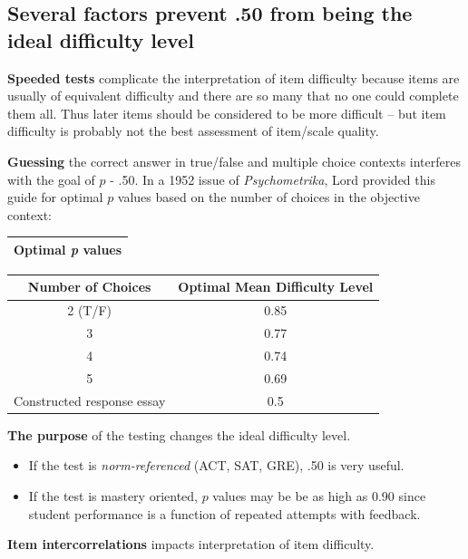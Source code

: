 \documentclass[
  english,
]{book}
\providecommand{\tightlist}{%
  \setlength{\itemsep}{0pt}\setlength{\parskip}{0pt}}
\begin{document}
\hypertarget{several-factors-prevent-.50-from-being-the-ideal-difficulty-level}{%
\subsection{Several factors prevent .50 from being the ideal difficulty level}\label{several-factors-prevent-.50-from-being-the-ideal-difficulty-level}}

\textbf{Speeded tests} complicate the interpretation of item difficulty because items are usually of equivalent difficulty and there are so many that no one could complete them all. Thus later items should be considered to be more difficult -- but item difficulty is probably not the best assessment of item/scale quality.

\textbf{Guessing} the correct answer in true/false and multiple choice contexts interferes with the goal of \(p\) - .50. In a 1952 issue of \emph{Psychometrika}, Lord provided this guide for optimal \(p\) values based on the number of choices in the objective context:

\begin{longtable}[]{@{}l@{}}
\toprule
Optimal \emph{p} values \\
\midrule
\endhead
\bottomrule
\end{longtable}

\begin{longtable}[]{@{}cc@{}}
\toprule
Number of Choices & Optimal Mean Difficulty Level \\
\midrule
\endhead
2 (T/F) & 0.85 \\
3 & 0.77 \\
4 & 0.74 \\
5 & 0.69 \\
Constructed response essay & 0.5 \\
\bottomrule
\end{longtable}

\textbf{The purpose} of the testing changes the ideal difficulty level.

\begin{itemize}
\tightlist
\item
  If the test is \emph{norm-referenced} (ACT, SAT, GRE), .50 is very useful.
\item
  If the test is mastery oriented, \(p\) values may be be as high as 0.90 since student performance is a function of repeated attempts with feedback.
\end{itemize}

\textbf{Item intercorrelations} impacts interpretation of item difficulty.
\end{document}

